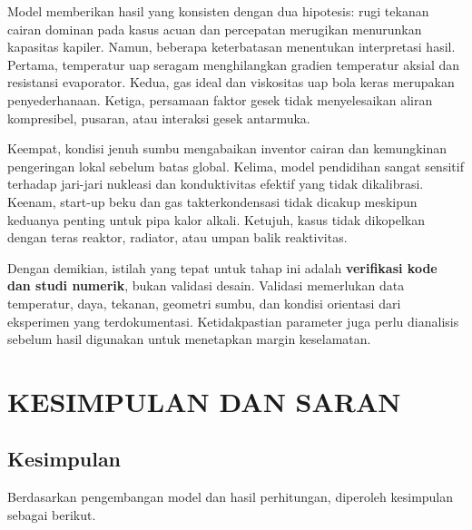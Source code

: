 \documentclass[
  12pt,
  12pt,a4paper,oneside]{report}
\begin{document}
Model memberikan hasil yang konsisten dengan dua hipotesis: rugi tekanan
cairan dominan pada kasus acuan dan percepatan merugikan menurunkan
kapasitas kapiler. Namun, beberapa keterbatasan menentukan interpretasi
hasil. Pertama, temperatur uap seragam menghilangkan gradien temperatur
aksial dan resistansi evaporator. Kedua, gas ideal dan viskositas uap
bola keras merupakan penyederhanaan. Ketiga, persamaan faktor gesek
tidak menyelesaikan aliran kompresibel, pusaran, atau interaksi gesek
antarmuka.

Keempat, kondisi jenuh sumbu mengabaikan inventor cairan dan kemungkinan
pengeringan lokal sebelum batas global. Kelima, model pendidihan sangat
sensitif terhadap jari-jari nukleasi dan konduktivitas efektif yang
tidak dikalibrasi. Keenam, start-up beku dan gas takterkondensasi tidak
dicakup meskipun keduanya penting untuk pipa kalor alkali. Ketujuh,
kasus tidak dikopelkan dengan teras reaktor, radiator, atau umpan balik
reaktivitas.

Dengan demikian, istilah yang tepat untuk tahap ini adalah
\textbf{verifikasi kode dan studi numerik}, bukan validasi desain.
Validasi memerlukan data temperatur, daya, tekanan, geometri sumbu, dan
kondisi orientasi dari eksperimen yang terdokumentasi. Ketidakpastian
parameter juga perlu dianalisis sebelum hasil digunakan untuk menetapkan
margin keselamatan.

\hypertarget{kesimpulan-dan-saran}{%
\chapter{KESIMPULAN DAN SARAN}\label{kesimpulan-dan-saran}}

\hypertarget{kesimpulan}{%
\section{Kesimpulan}\label{kesimpulan}}

Berdasarkan pengembangan model dan hasil perhitungan, diperoleh
kesimpulan sebagai berikut.
\end{document}

